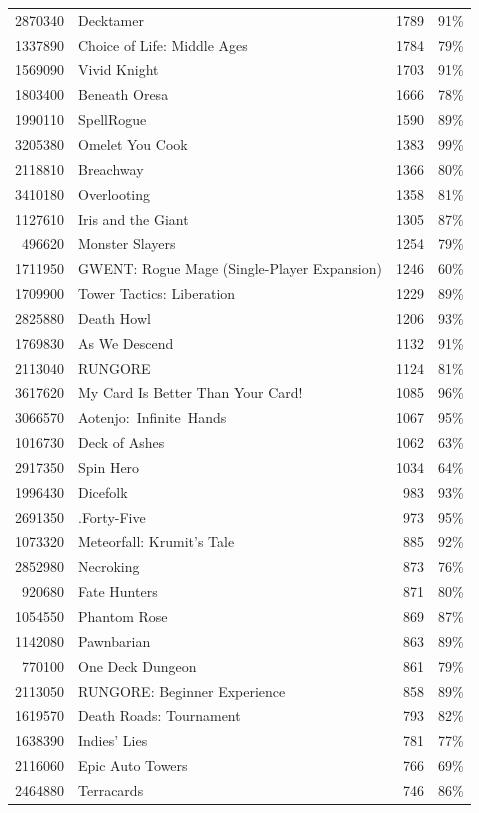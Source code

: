 \documentclass[11pt,letterpaper]{report}
\begin{document}
\begin{center}
\begin{tabular}{rlrl}
2870340 & Decktamer & 1789 & 91\%\\
1337890 & Choice of Life: Middle Ages & 1784 & 79\%\\
1569090 & Vivid Knight & 1703 & 91\%\\
1803400 & Beneath Oresa & 1666 & 78\%\\
1990110 & SpellRogue & 1590 & 89\%\\
3205380 & Omelet You Cook & 1383 & 99\%\\
2118810 & Breachway & 1366 & 80\%\\
3410180 & Overlooting & 1358 & 81\%\\
1127610 & Iris and the Giant & 1305 & 87\%\\
496620 & Monster Slayers & 1254 & 79\%\\
1711950 & GWENT: Rogue Mage (Single-Player Expansion) & 1246 & 60\%\\
1709900 & Tower Tactics: Liberation & 1229 & 89\%\\
2825880 & Death Howl & 1206 & 93\%\\
1769830 & As We Descend & 1132 & 91\%\\
2113040 & RUNGORE & 1124 & 81\%\\
3617620 & My Card Is Better Than Your Card! & 1085 & 96\%\\
3066570 & Aotenjo: Infinite Hands & 1067 & 95\%\\
1016730 & Deck of Ashes & 1062 & 63\%\\
2917350 & Spin Hero & 1034 & 64\%\\
1996430 & Dicefolk & 983 & 93\%\\
2691350 & .Forty-Five & 973 & 95\%\\
1073320 & Meteorfall: Krumit's Tale & 885 & 92\%\\
2852980 & Necroking & 873 & 76\%\\
920680 & Fate Hunters & 871 & 80\%\\
1054550 & Phantom Rose & 869 & 87\%\\
1142080 & Pawnbarian & 863 & 89\%\\
770100 & One Deck Dungeon & 861 & 79\%\\
2113050 & RUNGORE: Beginner Experience & 858 & 89\%\\
1619570 & Death Roads: Tournament & 793 & 82\%\\
1638390 & Indies' Lies & 781 & 77\%\\
2116060 & Epic Auto Towers & 766 & 69\%\\
2464880 & Terracards & 746 & 86\%\\

\end{tabular}
\end{center}
\end{document}
